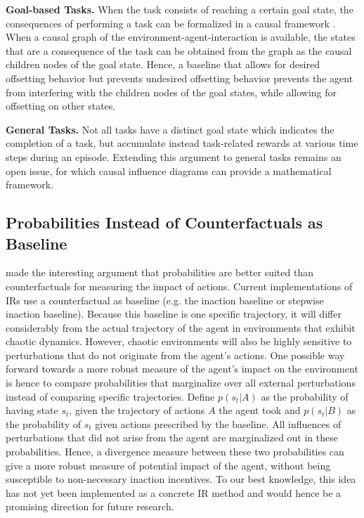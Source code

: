 \documentclass[letterpaper]{article} %
\newcommand{\statement}[1]{\textbf{#1}}
\begin{document}
\statement{Goal-based Tasks.} When the task consists of reaching a certain goal state, the consequences of performing a task can be formalized in a causal framework \citep{pearl2009causality}. When a causal graph of the environment-agent-interaction is available, the states that are a consequence of the task can be obtained from the graph as the causal children nodes of the goal state. Hence, a baseline that allows for desired offsetting behavior but prevents undesired offsetting behavior prevents the agent from interfering with the children nodes of the goal states, while allowing for offsetting on other states.

\statement{General Tasks.} Not all tasks have a distinct goal state which indicates the completion of a task, but accumulate instead task-related rewards at various time steps during an episode. Extending this argument to general tasks remains an open issue, for which causal influence diagrams \citep{everitt2019understanding} can provide a mathematical framework.

\subsection{Probabilities Instead of Counterfactuals as Baseline}
\citet{armstrong2017low} made the interesting argument that probabilities are better suited than counterfactuals for measuring the impact of actions. Current implementations of IRs use a counterfactual as baseline (e.g. the inaction baseline or stepwise inaction baseline). Because this baseline is one specific trajectory, it will differ considerably from the actual trajectory of the agent in environments that exhibit chaotic dynamics. However, chaotic environments will also be highly sensitive to perturbations that do not originate from the agent's actions. One possible way forward towards a more robust measure of the agent's impact on the environment is hence to compare probabilities that marginalize over all external perturbations instead of comparing specific trajectories. Define $p(s_t|A)$ as the probability of having state $s_t$, given the trajectory of actions $A$ the agent took and $p(s_t|B)$ as the probability of $s_t$ given actions prescribed by the baseline. All influences of perturbations that did not arise from the agent are marginalized out in these probabilities. Hence, a divergence measure between these two probabilities can give a more robust measure of potential impact of the agent, without being susceptible to non-necessary inaction incentives.
To our best knowledge, this idea has not yet been implemented as a concrete IR method and would hence be a promising direction for future research.
\end{document}
